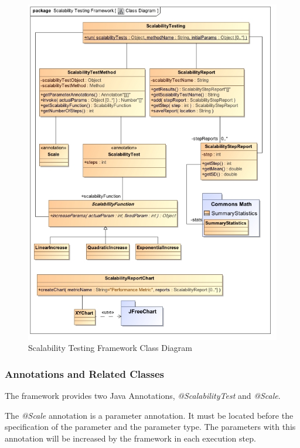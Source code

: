 \begin{figure}[htbp]
\begin{center}
	\includegraphics[scale=0.8]{images/classDiagram.jpg}
\caption{Scalability Testing Framework Class Diagram}
\label{classDiagram}
\end{center}
\end{figure}

\subsubsection{Annotations and Related Classes}
The framework provides two Java Annotations, \emph{@ScalabilityTest} and \emph{@Scale}. 

The \emph{@Scale} annotation is a parameter annotation. It must be located before the specification of the parameter and the parameter type. The parameters with this annotation will be increased by the framework in each execution step.


